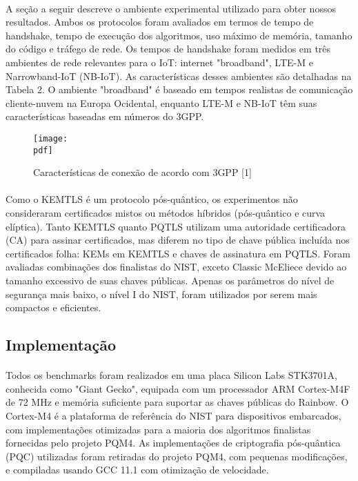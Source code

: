 \documentclass[letterpaper,11pt,leqno]{article}
\newcommand{\pdf}{figures/figures}
\begin{document}
\paragraph{}
A seção a seguir descreve o ambiente experimental utilizado para obter nossos
resultados. Ambos os protocolos foram avaliados em termos de tempo de handshake,
tempo de execução dos algoritmos, uso máximo de memória, tamanho do código e
tráfego de rede. Os tempos de handshake foram medidos em três ambientes de rede
relevantes para o IoT: internet "broadband", LTE-M e Narrowband-IoT (NB-IoT). As
características desses ambientes são detalhadas na Tabela 2. O ambiente
"broadband" é baseado em tempos realistas de comunicação cliente-nuvem na Europa
Ocidental, enquanto LTE-M e NB-IoT têm suas características baseadas em números
do 3GPP.

\begin{figure}[H]
	{\texttt{[image: \\pdf]}}
	\caption{Características de conexão de acordo com 3GPP [1]}
	\label{f:table2}\end{figure}

\paragraph{}
Como o KEMTLS é um protocolo pós-quântico, os experimentos não consideraram
certificados mistos ou métodos híbridos (pós-quântico e curva elíptica). Tanto
KEMTLS quanto PQTLS utilizam uma autoridade certificadora (CA) para assinar
certificados, mas diferem no tipo de chave pública incluída nos certificados
folha: KEMs em KEMTLS e chaves de assinatura em PQTLS. Foram avaliadas
combinações dos finalistas do NIST, exceto Classic McEliece devido ao tamanho
excessivo de suas chaves públicas. Apenas os parâmetros do nível de segurança
mais baixo, o nível I do NIST, foram utilizados por serem mais compactos e
eficientes.

\subsection{Implementação}

\paragraph{}
Todos os benchmarks foram realizados em uma placa Silicon Labs STK3701A,
conhecida como "Giant Gecko", equipada com um processador ARM Cortex-M4F de 72
MHz e memória suficiente para suportar as chaves públicas do Rainbow. O
Cortex-M4 é a plataforma de referência do NIST para dispositivos embarcados, com
implementações otimizadas para a maioria dos algoritmos finalistas fornecidas
pelo projeto PQM4. As implementações de criptografia pós-quântica (PQC)
utilizadas foram retiradas do projeto PQM4, com pequenas modificações, e
compiladas usando GCC 11.1 com otimização de velocidade.
\end{document}
